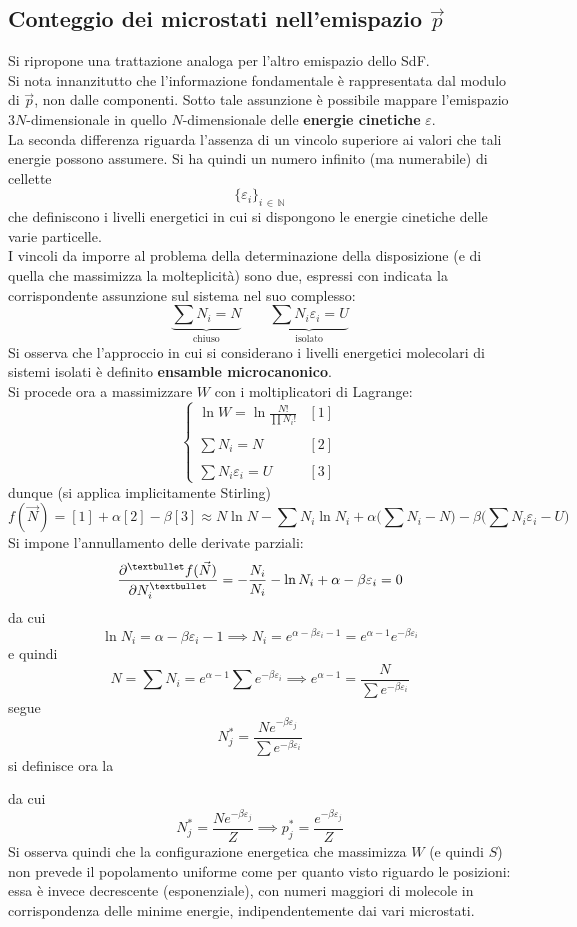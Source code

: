 \documentclass[10pt, oneside]{book}
\newcommand{\lawbox}[2]{\begin{center}
\framebox{
\parbox{\linewidth}{
\vspace{0.3cm}
\textbf{#1} \hfill $\displaystyle #2$
\vspace{0.3cm}
}
}
\end{center}}
\newcommand{\ds}{\displaystyle}
\newcommand{\setel}[1]{ \{ #1\} }
\begin{document}
\subsection{Conteggio dei microstati nell'emispazio $\vec{p}$}
Si ripropone una trattazione analoga per l'altro emispazio dello SdF.\\
Si nota innanzitutto che l'informazione fondamentale è rappresentata dal modulo di $\vec{p}$, non dalle componenti. Sotto tale assunzione è possibile mappare l'emispazio $3N$-dimensionale in quello $N$-dimensionale delle \textbf{energie cinetiche} $\varepsilon$.\\
La seconda differenza riguarda l'assenza di un vincolo superiore ai valori che tali energie possono assumere. Si ha quindi un numero infinito (ma numerabile) di cellette 
\[\setel{\varepsilon_i}_{i \, \in \, \mathbb{N}}\]
che definiscono i livelli energetici in cui si dispongono le energie cinetiche delle varie particelle.\\
I vincoli da imporre al problema della determinazione della disposizione (e di quella che massimizza la molteplicità) sono due, espressi con indicata la corrispondente assunzione sul sistema nel suo complesso:
\[\underbrace{\sum N_i = N}_{\textrm{chiuso}} \qquad \underbrace{\sum N_i \varepsilon_i = U}_{\textrm{isolato}}\]
Si osserva che l'approccio in cui si considerano i livelli energetici molecolari di sistemi isolati è definito \textbf{ensamble microcanonico}.\\
Si procede ora a massimizzare $W$ con i moltiplicatori di Lagrange:
\[\begin{cases} \displaystyle \ln W = \ln \frac{N!}{\prod N_i !} & [1]\\ \\ \displaystyle \sum N_i = N & [2] \\ \\ \ds \sum N_i \varepsilon_i = U & [3]
\end{cases}\]
dunque (si applica implicitamente Stirling)
\[f(\vec{N}) = [1] + \alpha [2] - \beta [3] \approx N \ln N - \sum N_i \ln N_i + \alpha \big(\sum N_i - N\big) - \beta \big(\sum N_i \varepsilon_i - U\big)\]
Si impone l'annullamento delle derivate parziali:
\[\pdv[•]{f(\vec{N})}{N_i} = - \frac{N_i}{N_i} - \ln N_i + \alpha - \beta \varepsilon_i = 0\]
da cui
\[\ln N_i = \alpha - \beta \varepsilon_i - 1 \implies N_i = e^{\alpha - \beta \varepsilon_i - 1} = e^{\alpha - 1}e^{- \beta \varepsilon_i}\]
e quindi
\[N = \sum N_i = e^{\alpha - 1} \sum e^{- \beta \varepsilon_i} \implies e^{\alpha - 1} = \frac{N}{\sum e^{- \beta \varepsilon_i}}\]
segue
\[N_j^\ast = \frac{N e^{- \beta \varepsilon_j}}{\sum e^{- \beta \varepsilon_i}}\]
si definisce ora la
\lawbox{Funzione di partizione (molecolare)}{Z \equiv \sum e^{\ds - \beta \varepsilon_i}}
da cui
\[N_j^\ast = \frac{N e^{- \beta \varepsilon_j}}{Z} \implies p_j^\ast = \frac{e^{- \beta \varepsilon_j}}{Z}\]
Si osserva quindi che la configurazione energetica che massimizza $W$ (e quindi $S$) non prevede il popolamento uniforme come per quanto visto riguardo le posizioni: essa è invece decrescente (esponenziale), con numeri maggiori di molecole in corrispondenza delle minime energie, indipendentemente dai vari microstati.
\end{document}

